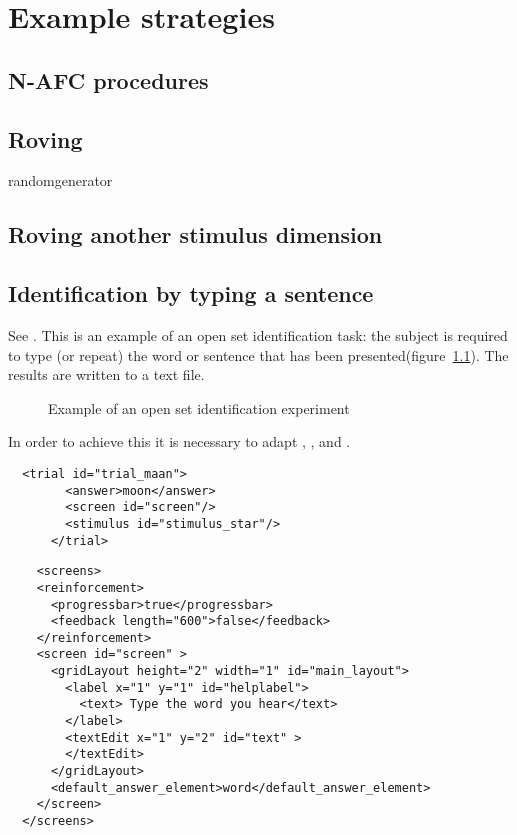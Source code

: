 
\chapter{Example strategies}
\label{chap:Examplestrategies}

\section{N-AFC procedures}



\section{Roving} \label{sec:roving}


randomgenerator

\section{Roving another stimulus dimension}

\section{Identification by typing a sentence}

 See
. This is an
example of an open set identification task: the subject is
required to type (or repeat) the word or sentence that has been
presented(figure~\ref{fig:opensetidentification}). The results are
written to a text file.

\begin{figure}
 \centering
 \caption{Example of an open set identification experiment}
 \label{fig:opensetidentification}
\end{figure}

In order to achieve this it is necessary to adapt ,
, and .


\begin{lstlisting}
  <trial id="trial_maan">
        <answer>moon</answer>
        <screen id="screen"/>
        <stimulus id="stimulus_star"/>
      </trial>
\end{lstlisting}


\begin{lstlisting}
    <screens>
    <reinforcement>
      <progressbar>true</progressbar>
      <feedback length="600">false</feedback>
    </reinforcement>
    <screen id="screen" >
      <gridLayout height="2" width="1" id="main_layout">
        <label x="1" y="1" id="helplabel">
          <text> Type the word you hear</text>
        </label>
        <textEdit x="1" y="2" id="text" >
        </textEdit>
      </gridLayout>
      <default_answer_element>word</default_answer_element>
    </screen>
  </screens>
\end{lstlisting}


